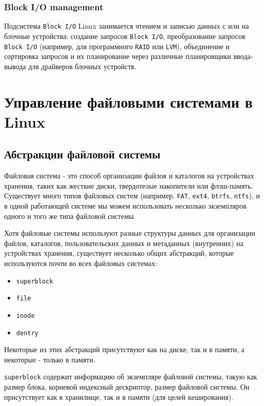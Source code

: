 \documentclass{article}
\begin{document}
    \subsubsection{Block I/O management}
    Подсистема \texttt{Block I/O} Linux занимается чтением и записью данных с
    или на блочные устройства: создание запросов \texttt{Block I/O},
    преобразование запросов \texttt{Block I/O} (например, для программного
    \texttt{RAID} или \texttt{LVM}), объединение и сортировка запросов и их
    планирование через различные планировщики ввода-вывода для драйверов блочных
    устройств.

    \section{Управление файловыми системами в Linux}
    \subsection{Абстракции файловой системы}

    Файловая система - это способ организации файлов и каталогов на
    устройствах хранения, таких как жесткие диски, твердотелые накопители или
    флэш-память. Существует много типов файловых систем (например, \texttt{FAT},
    \texttt{ext4}, \texttt{btrfs}, \texttt{ntfs}), и в одной работающей системе
    мы можем использовать несколько экземпляров одного и того же типа файловой
    системы.

    Хотя файловые системы используют разные структуры данных для организации
    файлов, каталогов, пользовательских данных и метаданных (внутренних) на
    устройствах хранения, существует несколько общих абстракций, которые
    используются почти во всех файловых системах:

    \begin{itemize}
        \item \texttt{superblock}
        \item \texttt{file}
        \item \texttt{inode}
        \item \texttt{dentry}
    \end{itemize}

    Некоторые из этих абстракций присутствуют как на диске, так и в памяти, а
    некоторые - только в памяти.

    \texttt{superblock} содержит информацию об экземпляре файловой системы,
    такую как размер блока, корневой индексный дескриптор, размер файловой
    системы. Он присутствует как в хранилище, так и в памяти (для целей
    кеширования).
\end{document}

